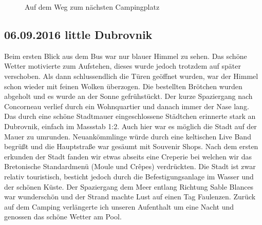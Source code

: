 \begin{figure}[H]
   \centering
   \quad
   \quad
   \quad
   \caption[Auf dem Weg zum nächsten Campingplatz]{Auf dem Weg zum nächsten Campingplatz}
\end{figure}

\subsection{06.09.2016 little Dubrovnik}
Beim ersten Blick aus dem Bus war nur blauer Himmel zu sehen.
Das schöne Wetter motivierte zum Aufstehen, dieses wurde jedoch trotzdem auf später verschoben.
Als dann schlussendlich die Türen geöffnet wurden, war der Himmel schon wieder mit feinen Wolken überzogen.
Die bestellten Brötchen wurden abgeholt und es wurde an der Sonne gefrühstückt.
Der kurze Spaziergang nach Concorneau verlief durch ein Wohnquartier und danach immer der Nase lang.
Das durch eine schöne Stadtmauer eingeschlossene Städtchen erinnerte stark an Dubrovnik, einfach im Massstab 1:2.
Auch hier war es möglich die Stadt auf der Mauer zu umrunden.
Neuankömmlinge würde durch eine keltischen Live Band begrüßt und die Hauptstraße war gesäumt mit Souvenir Shops.
Nach dem ersten erkunden der Stadt fanden wir etwas abseits eine Creperie bei welchen wir das Bretonische Standardmenü (Moule und Cr\^{e}pes) verdrückten.
Die Stadt ist zwar relativ touristisch, besticht jedoch durch die Befestigungsanlage im Wasser und der schönen Küste.
Der Spaziergang dem Meer entlang Richtung Sable Blances war wunderschön und der Strand machte Lust auf einen Tag Faulenzen.
Zurück auf dem Camping verlängerte ich unseren Aufenthalt um eine Nacht und genossen das schöne Wetter am Pool.


